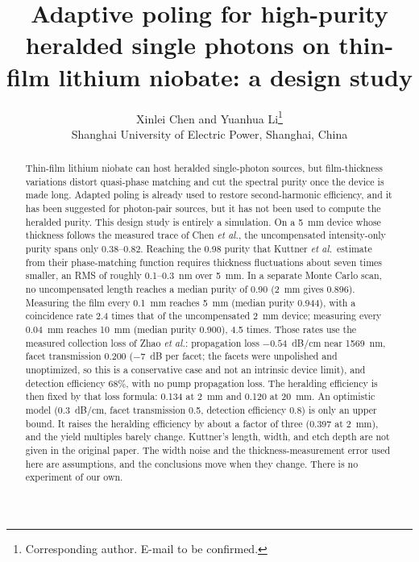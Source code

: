 \documentclass[11pt,a4paper]{article}
\title{Adaptive poling for high-purity heralded single photons on thin-film lithium niobate: a design study}
\author{%
Xinlei Chen and Yuanhua Li\thanks{Corresponding author. E-mail to be confirmed.}\\
Shanghai University of Electric Power, Shanghai, China%
}
\date{}
\begin{document}
\maketitle

\begin{abstract}
Thin-film lithium niobate can host heralded single-photon sources, but film-thickness variations distort quasi-phase matching and cut the spectral purity once the device is made long.
Adapted poling is already used to restore second-harmonic efficiency, and it has been suggested for photon-pair sources, but it has not been used to compute the heralded purity.
This design study is entirely a simulation.
On a 5~mm device whose thickness follows the measured trace of Chen \emph{et al.}, the uncompensated intensity-only purity spans only 0.38--0.82.
Reaching the 0.98 purity that Kuttner \emph{et al.}\ estimate from their phase-matching function requires thickness fluctuations about seven times smaller, an RMS of roughly 0.1--0.3~nm over 5~mm.
In a separate Monte Carlo scan, no uncompensated length reaches a median purity of 0.90 (2~mm gives 0.896).
Measuring the film every 0.1~mm reaches 5~mm (median purity 0.944), with a coincidence rate 2.4 times that of the uncompensated 2~mm device; measuring every 0.04~mm reaches 10~mm (median purity 0.900), 4.5 times.
Those rates use the measured collection loss of Zhao \emph{et al.}: propagation loss $-0.54$~dB/cm near 1569~nm, facet transmission 0.200 ($-7$~dB per facet; the facets were unpolished and unoptimized, so this is a conservative case and not an intrinsic device limit), and detection efficiency 68\%, with no pump propagation loss.
The heralding efficiency is then fixed by that loss formula: 0.134 at 2~mm and 0.120 at 20~mm.
An optimistic model (0.3~dB/cm, facet transmission 0.5, detection efficiency 0.8) is only an upper bound.
It raises the heralding efficiency by about a factor of three (0.397 at 2~mm), and the yield multiples barely change.
Kuttner's length, width, and etch depth are not given in the original paper.
The width noise and the thickness-measurement error used here are assumptions, and the conclusions move when they change.
There is no experiment of our own.
\end{abstract}
\end{document}
